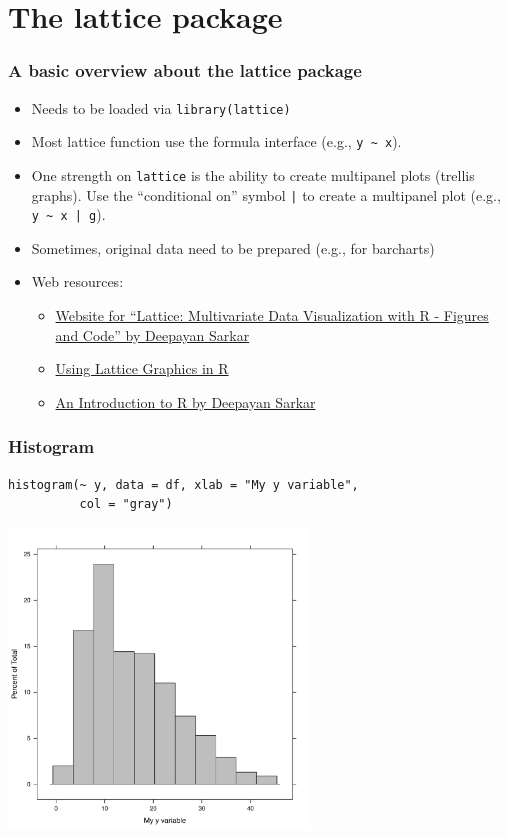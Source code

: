 \documentclass[bigger]{beamer}
\begin{document}
\section{The lattice package}
\label{sec-2}
\begin{frame}[shrink = 10]
\frametitle{A basic overview about the lattice package}
\label{sec-2_1}


\begin{itemize}
\item Needs to be loaded via \texttt{library(lattice)}
\item Most lattice function use the formula interface (e.g., \texttt{y \textasciitilde{} x}).
\item One strength on \texttt{lattice} is the ability to create multipanel plots (trellis graphs). Use the
  ``conditional on'' symbol \texttt{|} to create a multipanel plot (e.g., \texttt{y \textasciitilde{} x | g}).
\item Sometimes, original data need to be prepared (e.g., for barcharts)
\item Web resources:

\begin{itemize}
\item \href{http://lmdvr.r-forge.r-project.org/figures/figures.html}{Website for ``Lattice: Multivariate Data Visualization with R - Figures and Code'' by Deepayan Sarkar}
\item \href{http://www.cet.sunderland.ac.uk/~cs0her/Statistics/UsingLatticeGraphicsInR.htm}{Using Lattice Graphics in R}
\item \href{http://www.isid.ac.in/~deepayan/R-tutorials/labs/04_lattice_lab.pdf}{An Introduction to R by Deepayan Sarkar}
\end{itemize}

\end{itemize}
\end{frame}
\begin{frame}[fragile]
\frametitle{Histogram}
\label{sec-2_2}


\lstset{language=R}
\begin{lstlisting}
histogram(~ y, data = df, xlab = "My y variable", 
          col = "gray")
\end{lstlisting}



\includegraphics[width=0.6\textwidth]{../graphs/lattice_hist.pdf}
\end{frame}
\end{document}
